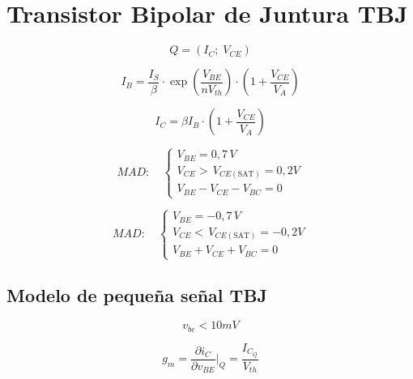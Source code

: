 \section{Transistor Bipolar de Juntura TBJ}
\begin{equation}
    Q = (I_C;\; V_{CE})
\end{equation}

\begin{equation}
    I_B = \frac{I_S}{\beta} \cdot \exp{\left(\frac{V_{BE}}{nV_{th}}\right)}\cdot \left( 1 + \frac{V_{CE}}{V_A} \right)
\end{equation}

\begin{equation}
    I_C = \beta I_B \cdot \left( 1 + \frac{V_{CE}}{V_A} \right)
\end{equation}


\begin{equation}
MAD: \quad \begin{cases}
V_{BE} = 0,7 \, V \\
V_{CE} > \, V_{CE(\text{SAT})} = 0,2 V \\
V_{BE} - V_{CE} - V_{BC} = 0
\end{cases}
\end{equation}

\begin{equation}
MAD: \quad \begin{cases}
V_{BE} = -0,7 \, V \\
V_{CE} < \, V_{CE(\text{SAT})} = -0,2 V \\
V_{BE} + V_{CE} + V_{BC} = 0
\end{cases}
\end{equation}

\subsection{Modelo de pequeña señal TBJ}

\begin{equation*}
    v_{be} < 10mV
\end{equation*}

\begin{equation}
    g_m = \frac{\partial i_C}{\partial v_{BE}} \Bigg|_Q = \frac{I_{C_Q}}{V_{th}}
\end{equation}

